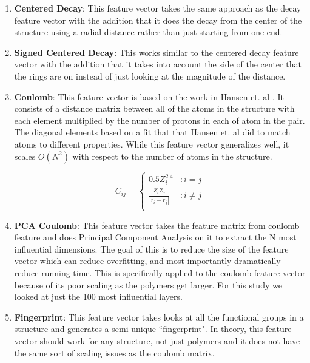 \documentclass[10pt, oneside]{article}   	%
\begin{document}
\begin{enumerate}
\item \textbf{Centered Decay}: This feature vector takes the same approach as the decay feature vector with the addition that it does the decay from the center of the structure using a radial distance rather than just starting from one end.

\item \textbf{Signed Centered Decay}: This works similar to the centered decay feature vector with the addition that it takes into account the side of the center that the rings are on instead of just looking at the magnitude of the distance.

\item \textbf{Coulomb}: This feature vector is based on the work in Hansen et. al \cite{Hansen}. It consists of a distance matrix between all of the atoms in the structure with each element multiplied by the number of protons in each of atom in the pair. The diagonal elements based on a fit that that Hansen et. al did to match atoms to different properties. While this feature vector generalizes well, it scales $O(N^2)$ with respect to the number of atoms in the structure.

$$
 C_{ij} =
  \begin{cases}
       0.5 Z_i^{2.4} & : i = j \\
    \frac{Z_i Z_j}{| r_i - r_j |} & : i \neq j \\
  \end{cases}
$$

\item \textbf{PCA Coulomb}: This feature vector takes the feature matrix from coulomb feature and does Principal Component Analysis on it to extract the N most influential dimensions. The goal of this is to reduce the size of the feature vector which can reduce overfitting, and most importantly dramatically reduce running time. This is specifically applied to the coulomb feature vector because of its poor scaling as the polymers get larger. For this study we looked at just the 100 most influential layers.

\item \textbf{Fingerprint}\cite{rdkit}: This feature vector takes looks at all the functional groups in a structure and generates a semi unique ``fingerprint". In theory, this feature vector should work for any structure, not just polymers and it does not have the same sort of scaling issues as the coulomb matrix.



\end{enumerate}
\end{document}
